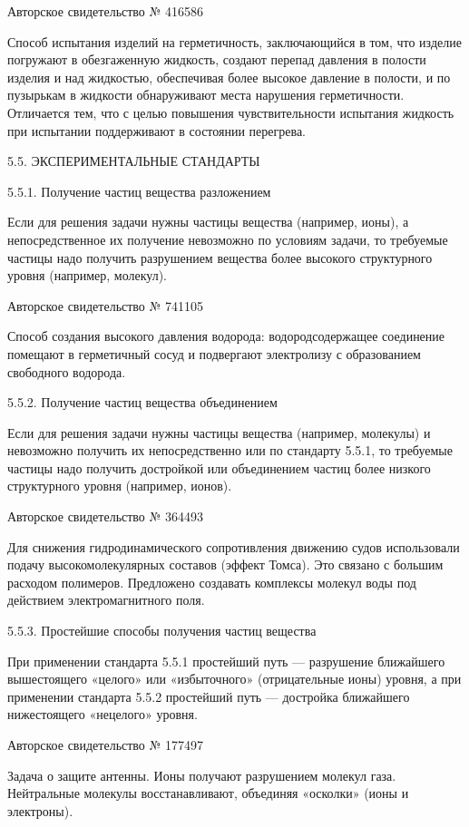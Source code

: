 Авторское свидетельство № 416586

Способ испытания  изделий на  герметичность, заключающийся в  том, что
изделие погружают в обезгаженную  жидкость, создают перепад давления в
полости изделия и над жидкостью,  обеспечивая более высокое давление в
полости,  и  по  пузырькам  в жидкости  обнаруживают  места  нарушения
герметичности. Отличается тем, что  с целью повышения чувствительности
испытания жидкость при испытании поддерживают в состоянии перегрева.

5.5. ЭКСПЕРИМЕНТАЛЬНЫЕ СТАНДАРТЫ

5.5.1. Получение частиц вещества разложением

Если для  решения задачи  нужны частицы  вещества (например,  ионы), а
непосредственное  их  получение  невозможно  по  условиям  задачи,  то
требуемые частицы  надо получить  разрушением вещества  более высокого
структурного уровня (например, молекул).

Авторское свидетельство № 741105

Способ   создания   высокого  давления   водорода:   водородсодержащее
соединение  помещают в  герметичный сосуд  и подвергают  электролизу с
образованием свободного водорода.

5.5.2. Получение частиц вещества объединением

Если для решения задачи нужны  частицы вещества (например, молекулы) и
невозможно  получить их  непосредственно  или по  стандарту 5.5.1,  то
требуемые  частицы надо  получить достройкой  или объединением  частиц
более низкого структурного уровня (например, ионов).

Авторское свидетельство № 364493

Для   снижения   гидродинамического   сопротивления   движению   судов
использовали  подачу высокомолекулярных  составов (эффект  Томса). Это
связано с  большим расходом полимеров. Предложено  создавать комплексы
молекул воды под действием электромагнитного поля.

5.5.3. Простейшие способы получения частиц вещества

При применении стандарта 5.5.1 простейший путь — разрушение ближайшего
вышестоящего «целого» или «избыточного» (отрицательные ионы) уровня, а
при применении стандарта 5.5.2  простейший путь — достройка ближайшего
нижестоящего «нецелого» уровня.

Авторское свидетельство № 177497

Задача  о  защите антенны.  Ионы  получают  разрушением молекул  газа.
Нейтральные  молекулы  восстанавливают,  объединяя «осколки»  (ионы  и
электроны).


